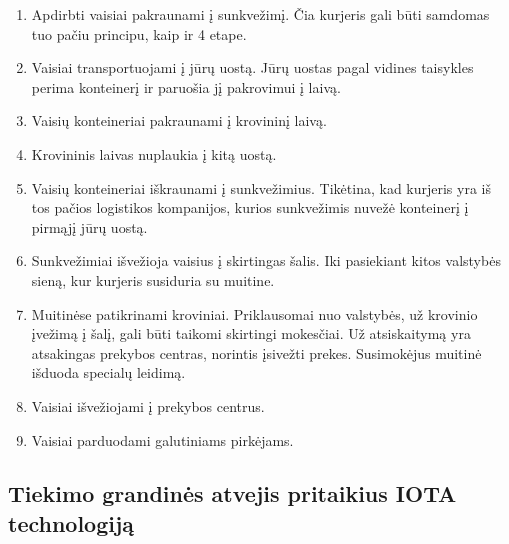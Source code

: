 \begin{enumerate}
    \item Apdirbti vaisiai pakraunami į sunkvežimį. Čia kurjeris gali būti samdomas tuo pačiu principu, kaip ir 4 etape.
    \item Vaisiai transportuojami į jūrų uostą. Jūrų uostas pagal vidines taisykles perima konteinerį ir paruošia jį pakrovimui į laivą.
    \item Vaisių konteineriai pakraunami į krovininį laivą.
    \item Krovininis laivas nuplaukia į kitą uostą.
    \item Vaisių konteineriai iškraunami į sunkvežimius. Tikėtina, kad kurjeris yra iš tos pačios logistikos kompanijos, kurios sunkvežimis nuvežė konteinerį į pirmąjį jūrų uostą.
    \item Sunkvežimiai išvežioja vaisius į skirtingas šalis. Iki pasiekiant kitos valstybės sieną, kur kurjeris susiduria su muitine.
    \item Muitinėse patikrinami kroviniai. Priklausomai nuo valstybės, už krovinio įvežimą į šalį, gali būti taikomi skirtingi mokesčiai. Už atsiskaitymą yra atsakingas prekybos centras, norintis įsivežti prekes. Susimokėjus muitinė išduoda specialų leidimą.
    \item Vaisiai išvežiojami į prekybos centrus.
    \item Vaisiai parduodami galutiniams pirkėjams.
\end{enumerate}
\bigskip

\subsection{Tiekimo grandinės atvejis pritaikius IOTA technologiją}